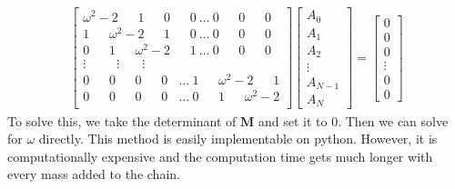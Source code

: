 \documentclass{article}
\newcommand{\ve}{\mathbf}
\begin{document}
\begin{align}
    \begin{bmatrix}
        \omega^2-2\ \ \ \ \ \ \  1\ \ \ \ \ \ \ 0\ \ \ \ \ \ \ 0\ \dots\ 0\ \ \ \ \ \ \ 0\ \ \ \ \ \ \ 0\\ 
        1\ \ \ \ \ \ \ \omega^2-2\ \ \ \ \ \ \ 1 \ \ \ \ \ \ \ 0\ \dots\ 0\ \ \ \ \ \ \ 0\ \ \ \ \ \ \ 0\\
        0\ \ \ \ \ \ \ 1\ \ \ \ \ \ \ \omega^2-2 \ \ \ \ \ \ \ 1\ \dots\ 0\ \ \ \ \ \ \ 0\ \ \ \ \ \ \ 0\\
        \vdots\ \ \ \ \  \ \ \ \ \ \ \vdots \ \ \  \ \ \ \ \ \vdots \\ 
        0\ \ \ \ \ \ \ 0\ \ \ \ \ \ \ 0 \ \ \ \ \ \ \ 0 \ \ \ \ \dots\ 1\ \ \ \ \ \ \ \omega^2-2\ \ \ \ \ \ \ 1\\
        0\ \ \ \ \ \ \ 0\ \ \ \ \ \ \ 0 \ \ \ \ \ \ \ 0\ \ \ \ \dots\ 0\ \ \ \ \ \ \ 1\ \ \ \ \ \ \ \omega^2-2\\
    \end{bmatrix}\begin{bmatrix}
        A_0\\ 
        A_1\\ 
        A_2\\
        \vdots\\ 
        A_{N-1}\\
        A_N
    \end{bmatrix}
    =
    \begin{bmatrix}
        0\\ 
        0\\ 
        0\\
        \vdots\\ 
        0\\
        0
    \end{bmatrix}
\end{align}
To solve this, we take the determinant of $\ve{M}$ and set it to 0. Then we can solve 
for $\omega$ directly. This method is easily implementable on python. However, it 
is computationally expensive and the computation time 
gets much longer with every mass added to the chain. 
\end{document}
